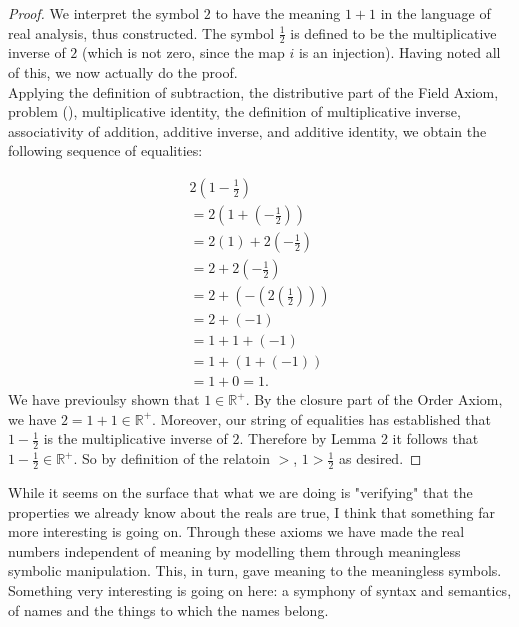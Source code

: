 \documentclass[11pt]{article}
\newcommand{\R}{\mathbb{R}}
\theoremstyle{definition}
\begin{document}
\begin{proof}
We interpret the symbol $2$ to have the meaning $1 + 1$ in the language of real analysis, thus constructed. The symbol $\frac{1}{2}$ is defined to be the multiplicative inverse of $2$ (which is not zero, since the map $i$ is an injection). Having noted all of this, we now actually do the proof.\\

Applying the definition of subtraction, the distributive part of the Field Axiom, problem (), multiplicative identity, the definition of multiplicative inverse, associativity of addition, additive inverse, and additive identity, we obtain the following sequence of equalities:

\[
\begin{array}{c}
2(1 - \frac{1}{2}) \\
= 
2(1 + (-\frac{1}{2}))\\
= 2(1) + 2(- \frac{1}{2})\\
= 2 + 2(-\frac{1}{2})\\
= 2 + (- (2(\frac{1}{2}))) \\
= 2 + (-1) \\
= 1 + 1 + (-1) \\
= 1 + (1 + (-1)) \\
= 1 + 0 = 1.
\end{array}       \]
We have previoulsy shown that $1\in \R^+$. By the closure part of the Order Axiom, we have $2 = 1 + 1 \in \R^+$. Moreover, our string of equalities has established that $ 1- \frac{1}{2}$ is the multiplicative inverse of $2$. Therefore by Lemma 2 it follows that $1-\frac{1}{2}\in \R^+$. So by definition of the relatoin $>$, $1> \frac{1}{2}$ as desired.

\end{proof}

While it seems on the surface that what we are doing is "verifying" that the properties we already know about the reals are true, I think that something far more interesting is going on. Through these axioms we have made the real numbers independent of meaning by modelling them through meaningless symbolic manipulation. This, in turn, gave meaning to the meaningless symbols. Something very interesting is going on here: a symphony of syntax and semantics, of names and the things to which the names belong.
\end{document}
